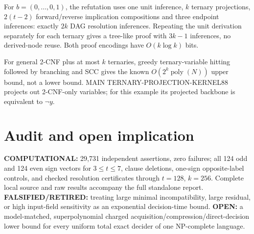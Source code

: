 \documentclass{article}
\begin{document}
For $b=(0,\ldots,0,1)$, the refutation uses one unit inference, $k$
ternary projections, $2(t-2)$ forward/reverse implication compositions
and three endpoint inferences: exactly $2k$ DAG resolution inferences.
Repeating the unit derivation separately for each ternary gives a
tree-like proof with $3k-1$ inferences, no derived-node reuse.
Both proof encodings have $O(k\log k)$ bits.

For general 2-CNF plus at most $k$ ternaries, greedy ternary-variable
hitting followed by branching and SCC gives the known
$O(2^k\operatorname{poly}(N))$ upper bound, not a lower bound.
MAIN TERNARY-PROJECTION-KERNEL88 projects out 2-CNF-only variables;
for this example its projected backbone is equivalent to $\neg y$.

\section*{Audit and open implication}
\textbf{COMPUTATIONAL:} 29,731 independent assertions, zero failures;
all 124 odd and 124 even sign vectors for $3\le t\le7$, clause
deletions, one-sign opposite-label controls, and checked resolution
certificates through $t=128$, $k=256$. Complete local source and raw
results accompany the full standalone report.
\textbf{FALSIFIED/RETIRED:} treating large minimal incompatibility,
large residual, or high input-field sensitivity as an exponential
decision-time bound. \textbf{OPEN:} a model-matched, superpolynomial
charged acquisition/compression/direct-decision lower bound for every
uniform total exact decider of one NP-complete language.
\end{document}
